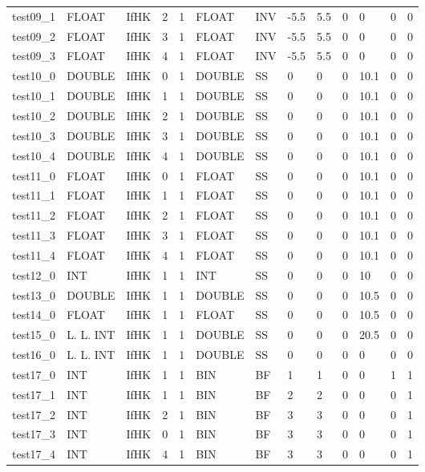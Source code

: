 \begin{longtable}{|l|l|l|p{0.5cm}|p{0.5cm}|l|p{0.5cm}|p{0.5cm}|p{0.5cm}|l|l|p{0.5cm}|l|}
test09\_1 & FLOAT & IfHK & 2 & 1 & FLOAT & INV & -5.5 & 5.5 & 0 & 0 & 0 & 0 \\
test09\_2 & FLOAT & IfHK & 3 & 1 & FLOAT & INV & -5.5 & 5.5 & 0 & 0 & 0 & 0 \\
test09\_3 & FLOAT & IfHK & 4 & 1 & FLOAT & INV & -5.5 & 5.5 & 0 & 0 & 0 & 0 \\
test10\_0 & DOUBLE & IfHK & 0 & 1 & DOUBLE & SS & 0 & 0 & 0 & 10.1 & 0 & 0 \\
test10\_1 & DOUBLE & IfHK & 1 & 1 & DOUBLE & SS & 0 & 0 & 0 & 10.1 & 0 & 0 \\
test10\_2 & DOUBLE & IfHK & 2 & 1 & DOUBLE & SS & 0 & 0 & 0 & 10.1 & 0 & 0 \\
test10\_3 & DOUBLE & IfHK & 3 & 1 & DOUBLE & SS & 0 & 0 & 0 & 10.1 & 0 & 0 \\
test10\_4 & DOUBLE & IfHK & 4 & 1 & DOUBLE & SS & 0 & 0 & 0 & 10.1 & 0 & 0 \\
test11\_0 & FLOAT & IfHK & 0 & 1 & FLOAT & SS & 0 & 0 & 0 & 10.1 & 0 & 0 \\
test11\_1 & FLOAT & IfHK & 1 & 1 & FLOAT & SS & 0 & 0 & 0 & 10.1 & 0 & 0 \\
test11\_2 & FLOAT & IfHK & 2 & 1 & FLOAT & SS & 0 & 0 & 0 & 10.1 & 0 & 0 \\
test11\_3 & FLOAT & IfHK & 3 & 1 & FLOAT & SS & 0 & 0 & 0 & 10.1 & 0 & 0 \\
test11\_4 & FLOAT & IfHK & 4 & 1 & FLOAT & SS & 0 & 0 & 0 & 10.1 & 0 & 0 \\
test12\_0 & INT & IfHK & 1 & 1 & INT & SS & 0 & 0 & 0 & 10 & 0 & 0 \\
test13\_0 & DOUBLE & IfHK & 1 & 1 & DOUBLE & SS & 0 & 0 & 0 & 10.5 & 0 & 0 \\
test14\_0 & FLOAT & IfHK & 1 & 1 & FLOAT & SS & 0 & 0 & 0 & 10.5 & 0 & 0 \\
test15\_0 & L. L. INT & IfHK & 1 & 1 & DOUBLE & SS & 0 & 0 & 0 & 20.5 & 0 & 0 \\
test16\_0 & L. L. INT & IfHK & 1 & 1 & DOUBLE & SS & 0 & 0 & 0 & 0 & 0 & 0 \\
test17\_0 & INT & IfHK & 1 & 1 & BIN & BF & 1 & 1 & 0 & 0 & 1 & 1 \\
test17\_1 & INT & IfHK & 1 & 1 & BIN & BF & 2 & 2 & 0 & 0 & 0 & 1 \\
test17\_2 & INT & IfHK & 2 & 1 & BIN & BF & 3 & 3 & 0 & 0 & 0 & 1 \\
test17\_3 & INT & IfHK & 0 & 1 & BIN & BF & 3 & 3 & 0 & 0 & 0 & 1 \\
test17\_4 & INT & IfHK & 4 & 1 & BIN & BF & 3 & 3 & 0 & 0 & 0 & 1 \\

\end{longtable}
